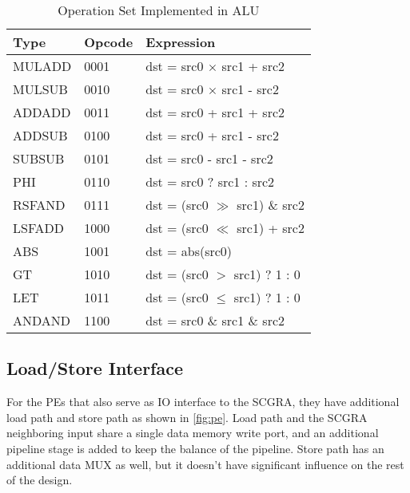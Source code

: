 \begin{table}[h]
\caption{Operation Set Implemented in ALU}
\label{tab:operations}
\centering
\begin{tabular}{|p{1.5cm}|p{1.5cm}|p{4cm}|}
\hline
Type & Opcode & Expression \\

\hline
MULADD & 0001 & {dst = src0 $\times$ src1 + src2} \\

\hline
MULSUB & 0010 & {dst = src0 $\times$ src1 - src2} \\

\hline
ADDADD & 0011 & {dst = src0 + src1 + src2} \\

\hline
ADDSUB & 0100 & {dst = src0 + src1 - src2} \\

\hline
SUBSUB & 0101 & {dst = src0 - src1 - src2} \\

\hline 
PHI & 0110 & {dst = src0 ? src1 : src2} \\

\hline
RSFAND & 0111 & {dst = (src0 $\gg$ src1) \& src2} \\

\hline
LSFADD & 1000 & {dst = (src0 $\ll$ src1) + src2} \\

\hline
ABS & 1001 & {dst = abs(src0)} \\

\hline
GT & 1010 & {dst = (src0 $>$ src1) ? 1 : 0} \\

\hline
LET & 1011 & {dst = (src0 $\leq$ src1) ? 1 : 0} \\

\hline
ANDAND & 1100 & {dst = src0 \& src1 \& src2} \\

\hline
\end{tabular}
\end{table}

\subsection{Load/Store Interface}
For the PEs that also serve as IO interface to the SCGRA, they have additional load path and store path as shown in \ref{fig:pe}. Load path and the SCGRA neighboring input share a single data memory write port, and an additional pipeline stage is added to keep the balance of the pipeline. Store path has an additional data MUX as well, but it doesn't have significant influence on the rest of the design. 

